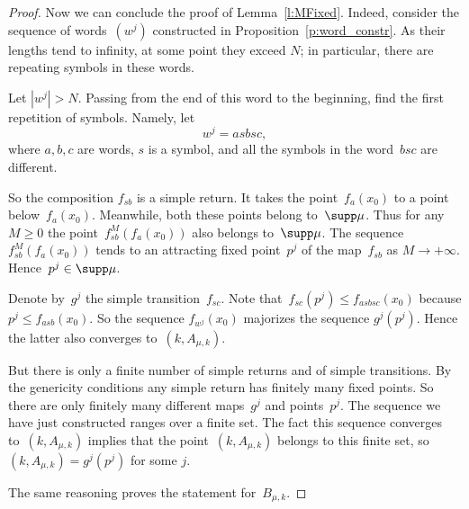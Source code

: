 \documentclass[a4paper,12pt]{amsart}
\begin{document}
\begin{proof}
Now we can conclude the proof of Lemma~\ref{l:MFixed}. Indeed, consider the sequence of words~$(w^j)$ constructed in Proposition~\ref{p:word_constr}. As their lengths tend to infinity, at some point they exceed $N$; in particular, there are repeating symbols in these words.

Let $|w^j| > N$. Passing from the end of this word to the beginning, find the first repetition of symbols. Namely, let
$$
w^j=asbsc,
$$
where $a,b,c$ are words, $s$ is a symbol, and all the symbols in the word~$bsc$ are different.

So the composition $f_{sb}$ is a simple return. It takes the point~$f_{a}(x_0)$ to a point below~$f_{a}(x_0)$. Meanwhile, both these points belong to~$\supp\mu$. Thus for any $M \ge 0$ the point~$f_{sb}^M(f_{a}(x_0))$ also belongs to~$\supp\mu$. The sequence~$f_{sb}^M(f_{a}(x_0))$ tends to an attracting fixed point~$p^j$ of the map~$f_{sb}$ as $M \to +\infty$. Hence~$p^j\in \supp\mu$.

Denote by~$g^j$ the simple transition~$f_{sc}$. Note that~$f_{sc}(p^j) \le f_{asbsc}(x_0)$ because $p^j \le f_{asb}(x_0)$. So the sequence $f_{w^j}(x_0)$ majorizes the sequence $g^j(p^j)$. Hence the latter also converges to~$(k,A_{\mu,k})$.

But there is only a finite number of simple returns and of simple transitions. By the genericity conditions any simple return has finitely many fixed points. So there are only finitely many different maps~$g^j$ and points~$p^j$. The sequence we have just constructed ranges over a finite set. The fact this sequence converges to~$(k,A_{\mu,k})$ implies that the point~$(k,A_{\mu,k})$ belongs to this finite set, so $(k,A_{\mu,k}) = g^j (p^j)$ for some $j$.

The same reasoning proves the statement for~$B_{\mu,k}$.
\end{proof}
\end{document}
